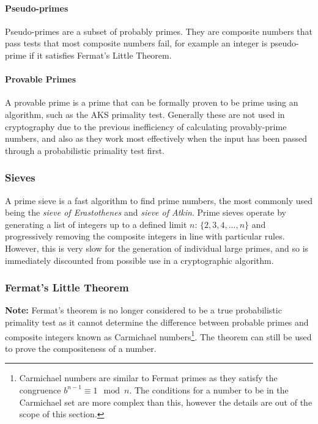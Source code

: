       \paragraph{Pseudo-primes}
      
      Pseudo-primes are a subset of probably primes. They are composite numbers that pass tests that most composite numbers fail, for example an integer is pseudo-prime if it satisfies Fermat's Little Theorem.
      
      \paragraph{Provable Primes}
      
      A provable prime is a prime that can be formally proven to be prime using an algorithm, such as the AKS primality test. Generally these are not used in cryptography due to the previous inefficiency of calculating provably-prime numbers, and also as they work most effectively when the input has been passed through a probabilistic primality test first.
  
    \subsubsection{Sieves}
    
    A prime sieve is a fast algorithm to find prime numbers, the most commonly used being the \emph{sieve of Erastothenes} and \emph{sieve of Atkin}. Prime sieves operate by generating a list of integers up to a defined limit $n$: $\{2,3,4,...,n\}$ and progressively removing the composite integers in line with particular rules. However, this is very slow for the generation of individual large primes, and so is immediately discounted from possible use in a cryptographic algorithm.
    
    \subsubsection{Fermat's Little Theorem}
    
    \textbf{Note:} Fermat's theorem is no longer considered to be a true probabilistic primality test as it cannot determine the difference between probable primes and composite integers known as Carmichael numbers\footnote{Carmichael numbers are similar to Fermat primes as they satisfy the congruence $b^{n-1} \equiv 1 \mod{n}$. The conditions for a number to be in the Carmichael set are more complex than this, however the details are out of the scope of this section.}. The theorem can still be used to prove the compositeness of a number.
    
